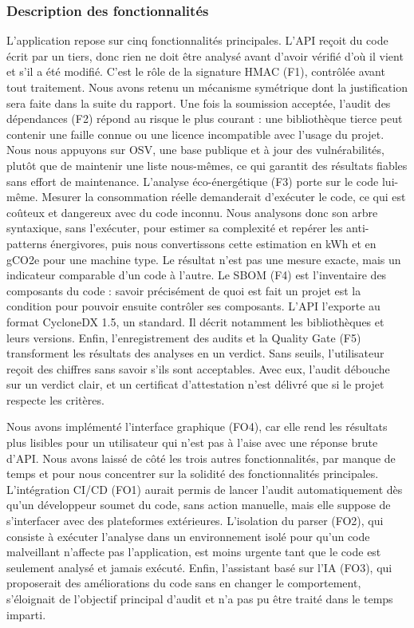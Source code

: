 \documentclass[a4paper,12pt]{article}
\begin{document}
\subsubsection{Description des
fonctionnalités}\label{description-des-fonctionnalituxe9s}

L'application repose sur cinq fonctionnalités principales. L'API reçoit
du code écrit par un tiers, donc rien ne doit être analysé avant d'avoir
vérifié d'où il vient et s'il a été modifié. C'est le rôle de la
signature HMAC (F1), contrôlée avant tout traitement. Nous avons retenu
un mécanisme symétrique dont la justification sera faite dans la suite
du rapport. Une fois la soumission acceptée, l'audit des dépendances
(F2) répond au risque le plus courant : une bibliothèque tierce peut
contenir une faille connue ou une licence incompatible avec l'usage du
projet. Nous nous appuyons sur OSV, une base publique et à jour des
vulnérabilités, plutôt que de maintenir une liste nous-mêmes, ce qui
garantit des résultats fiables sans effort de maintenance. L'analyse
éco-énergétique (F3) porte sur le code lui-même. Mesurer la consommation
réelle demanderait d'exécuter le code, ce qui est coûteux et dangereux
avec du code inconnu. Nous analysons donc son arbre syntaxique, sans
l'exécuter, pour estimer sa complexité et repérer les anti-patterns
énergivores, puis nous convertissons cette estimation en kWh et en gCO2e
pour une machine type. Le résultat n'est pas une mesure exacte, mais un
indicateur comparable d'un code à l'autre. Le SBOM (F4) est l'inventaire
des composants du code : savoir précisément de quoi est fait un projet
est la condition pour pouvoir ensuite contrôler ses composants. L'API
l'exporte au format CycloneDX 1.5, un standard. Il décrit notamment les
bibliothèques et leurs versions. Enfin, l'enregistrement des audits et
la Quality Gate (F5) transforment les résultats des analyses en un
verdict. Sans seuils, l'utilisateur reçoit des chiffres sans savoir
s'ils sont acceptables. Avec eux, l'audit débouche sur un verdict clair,
et un certificat d'attestation n'est délivré que si le projet respecte
les critères.

Nous avons implémenté l'interface graphique (FO4), car elle rend les
résultats plus lisibles pour un utilisateur qui n'est pas à l'aise avec
une réponse brute d'API. Nous avons laissé de côté les trois autres
fonctionnalités, par manque de temps et pour nous concentrer sur la
solidité des fonctionnalités principales. L'intégration CI/CD (FO1)
aurait permis de lancer l'audit automatiquement dès qu'un développeur
soumet du code, sans action manuelle, mais elle suppose de s'interfacer
avec des plateformes extérieures. L'isolation du parser (FO2), qui
consiste à exécuter l'analyse dans un environnement isolé pour qu'un
code malveillant n'affecte pas l'application, est moins urgente tant que
le code est seulement analysé et jamais exécuté. Enfin, l'assistant basé
sur l'IA (FO3), qui proposerait des améliorations du code sans en
changer le comportement, s'éloignait de l'objectif principal d'audit et
n'a pas pu être traité dans le temps imparti.
\end{document}

